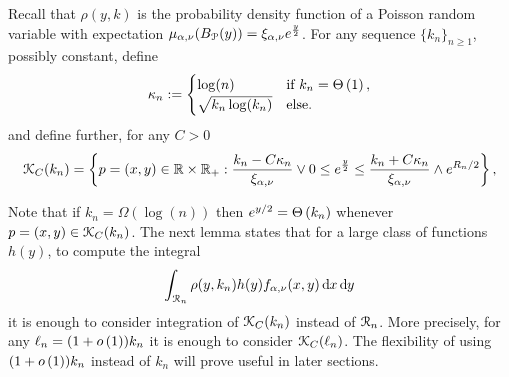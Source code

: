 Recall that $\rho(y, k)$ is the probability density function of a Poisson random variable with expectation $\mu_{\alpha, \nu}(B_{{\mathcal P}}(y)) = \xi_{\alpha,\nu}e^{\frac{y}{2}}$. 
For any sequence $\{k_n\}_{n \ge 1}$, possibly constant, define
\begin{equation}\label{eq:def_kappa_n}
	\kappa_n := \begin{cases}
		\log(n) &\mbox{if } k_n = \Theta\left(1\right),\\
		\sqrt{k_n \log(k_n)} &\mbox{else.}
	\end{cases}
\end{equation}
and define further, for any $C > 0$
\begin{equation}\label{eq:def_K_C_set}
	{\mathcal K}_C(k_n) = \left\{p=(x,y) \in {\ensuremath{\mathbb R}} \times {\ensuremath{\mathbb R}}_+ : \frac{k_n - C \kappa_n}{\xi_{\alpha,\nu}} \vee 0 \le e^{\frac{y}{2}}
	\le \frac{k_n + C \kappa_n}{\xi_{\alpha,\nu}} \wedge e^{R_n/2} \right\},
\end{equation}

Note that if $k_n = \Omega(\log(n))$ then $e^{y/2} = \Theta\left(k_n\right)$ whenever $p=(x,y) \in {\mathcal K}_C(k_n)$. The next lemma states that for a large class of functions $h(y)$, to compute the integral 
\[
	\int_{{\mathcal R}_n} \rho(y,k_n) h(y) f_{\alpha,\nu}(x,y) \operatorname{\mathrm{d}\hspace{-2pt}} x \operatorname{\mathrm{d}\hspace{-2pt}} y
\]
it is enough to consider integration of ${\mathcal K}_C(k_n)$ instead of ${\mathcal R}_n$. More precisely, for any $\ell_n = (1 + o\left(1\right))k_n$ it is enough to consider ${\mathcal K}_C(\ell_n)$. The flexibility of using $(1+o\left(1\right))k_n$ instead of $k_n$ will prove useful in later sections.


